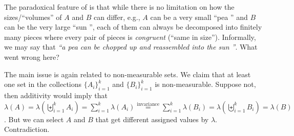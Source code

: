 \begin{enumerate}
The paradoxical feature of  is that while there is no
limitation on how the sizes/``volumes'' of \(A\) and \(B\) can differ, e.g.,
\(A\) can be a very small ``pea \gc{\(\bullet\)}'' and \(B\) can be the very
large ``sun '', each of them can always be decomposed into finitely
many pieces where every pair of pieces is \emph{congruent} (``same in
size'')\warn{}.  Informally, we may say that \textit{``a pea \gc{\(\bullet\)}
can be chopped up and reassembled into the sun ''}. What went wrong
here?

The main issue is again related to non-measurable sets. We claim that at least
one set in the collections \(\{A_i\}_{i=1}^{k}\) and \(\{B_i\}_{i=1}^{k}\) is
non-measurable. Suppose not, then additivity would imply that
\(\lambda(A)=\lambda(\biguplus_{i=1}^{k}A_i)=\sum_{i=1}^{k}\lambda(A_i)
\overset{\text{invariance}}{=}\sum_{i=1}^{k}\lambda(B_i)=\lambda(\biguplus_{i=1}^{k}B_i)=\lambda(B)\).
But we can select \(A\) and \(B\) that get different assigned values by
\(\lambda\). Contradiction.
\end{enumerate}
